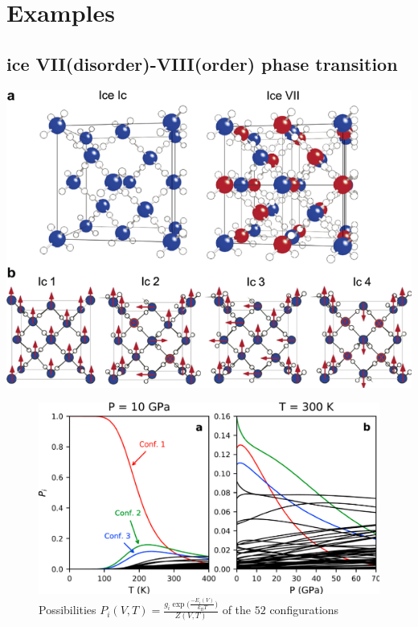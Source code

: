 \documentclass[13pt,aspectratio=169]{beamer}
\begin{document}
\section{Examples}

\subsection{ice VII(disorder)-VIII(order) phase transition}
\begin{frame}{\subsecname}
	\centering
	\includegraphics[height=0.9\textheight]{images/ice7}%
\end{frame}

\begin{frame}{\subsecname}
	\begin{figure}
		\includegraphics[height=0.75\textheight]{images/ice_prob}%
		\caption{Possibilities $P_i(V, T) = \frac{g_i \exp\Big(\frac{-E_i(V)}{k_B T}\Big)}{Z(V, T)}$ of the $52$ configurations}
	\end{figure}
\end{frame}
\end{document}
